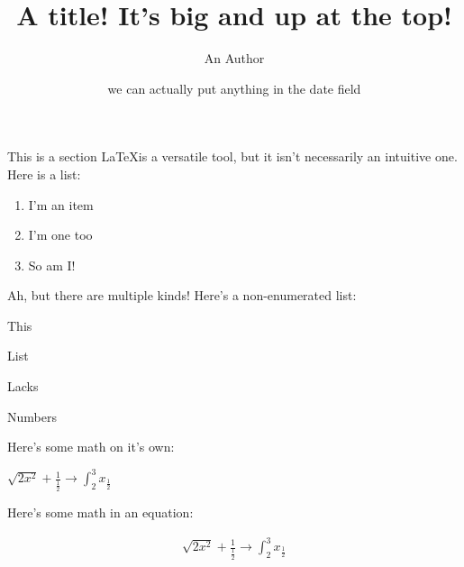 \documentclass[a4paper,10pt,notitlepage]{article}
\title{A title! It's big and up at the top!}
\author{An Author}
\date{we can actually put anything in the date field}
\begin{document}
\lstset{language=Mathematica}

\maketitle


\begin{section}{This is a section}
\LaTeX is a versatile tool, but it isn't necessarily an intuitive one. Here is a list:

\begin{enumerate}
\item I'm an item
\item I'm one too
\item So am I!
\end{enumerate}

Ah, but there are multiple kinds! Here's a non-enumerated list:

\begin{list}{}{}
\item This
\item List
\item Lacks
\item Numbers
\end{list}

Here's some math on it's own:

 \(\sqrt{2x^2} + \frac{1}{\frac{1}{2}} \rightarrow \int_{2}^{3} x_{\frac{1}{2}}\)

Here's some math in an equation:

\begin{align}
\sqrt{2x^2} + \frac{1}{\frac{1}{2}} \rightarrow \int_{2}^{3} x_{\frac{1}{2}}
\end{align}



\end{section}
\end{document}
